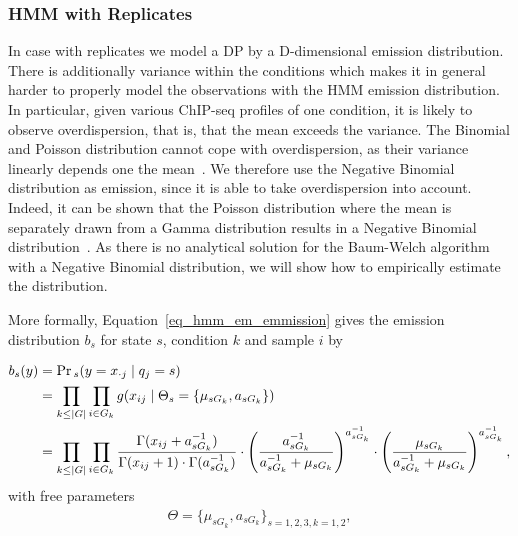 \subsubsection{HMM with Replicates}
\label{sec_method_hmm_with}
In case with replicates we model a DP by a D-dimensional emission distribution. 
There is additionally variance within the conditions which makes it in general harder to properly model the observations with the HMM emission distribution.
In particular, given various ChIP-seq profiles of one condition, it is likely to observe overdispersion, that is, that the mean exceeds the variance.
The Binomial and Poisson distribution cannot cope with overdispersion, as their variance linearly depends one the mean~\citep{Ismail2007}.
We therefore use the Negative Binomial distribution as emission, since it is able to take overdispersion into account.
Indeed, it can be shown that the Poisson distribution where the mean is separately drawn from a Gamma distribution results in a Negative Binomial distribution~\citep{Cameron1999}.
As there is no analytical solution for the Baum-Welch algorithm with a Negative Binomial distribution, we will show how to empirically estimate the distribution.

More formally, Equation~\ref{eq_hmm_em_emmission} gives the emission distribution $b_s$ for state $s$, condition $k$ and sample $i$ by

\begin{align}
 b_s(y) &= \Pr\textstyle_{s}(y = x_{\cdot j} \mid q_j = s) \notag \\
 &= \prod_{k \leq \mid G \mid} \prod_{i \in G_k} g(x_{ij} \mid \Theta_s = \{\mu_{sG_k}, a_{sG_k} \}) \label{eq_hmm_neg_bin_emission_g} \\
 &= \prod_{k \leq \mid G \mid} \prod_{i \in G_k} \frac{\Gamma(x_{ij} + a_{sG_k}^{-1})}{\Gamma(x_{ij} + 1) \cdot \Gamma(a_{sG_k}^{-1})} \cdot \left( \frac{a_{sG_k}^{-1}}{a_{sG_k}^{-1} + \mu_{sG_k}} \right)^{a_{sG_k}^{-1}} \cdot \left( \frac{\mu_{sG_k}}{a_{sG_k}^{-1} + \mu_{sG_k}} \right)^{a_{sG_k}^{-1}}, \label{eq_hmm_neg_bin_emission}
\end{align}
\noindent
with free parameters
\begin{align*}
 \Theta = \{\mu_{sG_k}, a_{sG_k}\}_{s = 1,2,3, k = 1,2},%
\end{align*}

